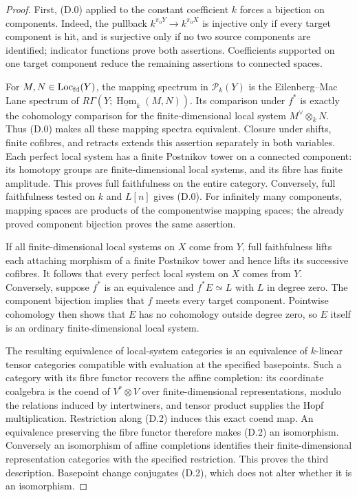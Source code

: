 \begin{proof}
First, (D.0) applied to the constant coefficient $k$ forces a bijection
on components. Indeed, the pullback $k^{\pi_0Y}\to k^{\pi_0X}$ is
injective only if every target component is hit, and is surjective only
if no two source components are identified; indicator functions prove
both assertions. Coefficients supported on one target component reduce
the remaining assertions to connected spaces.

For $M,N\in\operatorname{Loc}_{\mathrm{fd}}(Y)$, the mapping spectrum in $\mathcal P_k(Y)$ is
the Eilenberg--Mac Lane spectrum of
$R\Gamma(Y;\underline{\operatorname{Hom}}_k(M,N))$.
Its comparison under $f^*$ is exactly the cohomology comparison for the
finite-dimensional local system $M^\vee\otimes_kN$. Thus (D.0) makes
all these mapping spectra equivalent. Closure under shifts, finite
cofibres, and retracts extends this assertion separately in both
variables. Each perfect local system has a finite Postnikov tower on a
connected component: its homotopy groups are finite-dimensional local
systems, and its fibre has finite amplitude. This proves full
faithfulness on the entire category. Conversely, full faithfulness
tested on $k$ and $L[n]$ gives (D.0). For infinitely many components,
mapping spaces are products of the componentwise mapping spaces; the
already proved component bijection proves the same assertion.

If all finite-dimensional local systems on $X$ come from $Y$, full
faithfulness lifts each attaching morphism of a finite Postnikov tower
and hence lifts its successive cofibres. It follows that every perfect
local system on $X$ comes from $Y$. Conversely, suppose $f^*$ is an
equivalence and $f^*E\simeq L$ with $L$ in degree zero. The component
bijection implies that $f$ meets every target component. Pointwise
cohomology then shows that $E$ has no cohomology outside degree zero,
so $E$ itself is an ordinary finite-dimensional local system.

The resulting equivalence of local-system categories is an equivalence
of $k$-linear tensor categories compatible with evaluation at the
specified basepoints. Such a category with its fibre functor recovers
the affine completion: its coordinate coalgebra is the coend of
$V^*\otimes V$ over finite-dimensional representations, modulo the
relations induced by intertwiners, and tensor product supplies the Hopf
multiplication. Restriction along (D.2) induces this exact coend map.
An equivalence preserving the fibre functor therefore makes (D.2) an
isomorphism. Conversely an isomorphism of affine completions identifies
their finite-dimensional representation categories with the specified
restriction. This proves the third description. Basepoint change
conjugates (D.2), which does not alter whether it is an isomorphism.


\end{proof}
